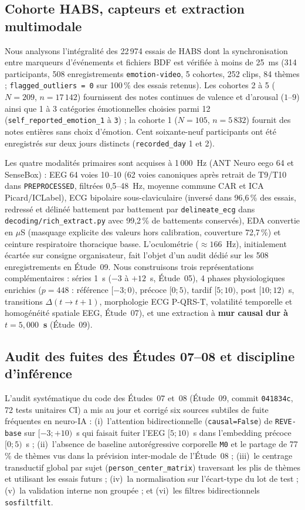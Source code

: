 \documentclass[10pt]{article}
\begin{document}
\subsection{Cohorte HABS, capteurs et extraction multimodale}

Nous analysons l'intégralité des 22\,974 essais de HABS dont la synchronisation entre marqueurs d'événements et fichiers BDF est vérifiée à moins de 25~ms (314 participants, 508 enregistrements \texttt{emotion-video}, 5 cohortes, 252 clips, 84 thèmes ; \texttt{flagged\_outliers = 0} sur 100\,\% des essais retenus). Les cohortes 2 à 5 ($N = 209$, $n = 17\,142$) fournissent des notes continues de valence et d'arousal ($1$--$9$) ainsi que 1 à 3 catégories émotionnelles choisies parmi 12 (\texttt{self\_reported\_emotion\_1} à \texttt{3}) ; la cohorte 1 ($N = 105$, $n = 5\,832$) fournit des notes entières sans choix d'émotion. Cent soixante-neuf participants ont été enregistrés sur deux jours distincts (\texttt{recorded\_day} 1 et 2).

Les quatre modalités primaires sont acquises à 1\,000~Hz (ANT Neuro eego 64 et SenseBox) : EEG 64 voies 10--10 (62 voies canoniques après retrait de T9/T10 dans \texttt{PREPROCESSED}, filtrées 0,5--48~Hz, moyenne commune CAR et ICA Picard/ICLabel), ECG bipolaire sous-claviculaire (inversé dans 96,6\,\% des essais, redressé et délinéé battement par battement par \texttt{delineate\_ecg} dans \texttt{decoding/\allowbreak rich\_extract.py} avec 99,2\,\% de battements conservés), EDA convertie en $\mu$S (masquage explicite des valeurs hors calibration, couverture 72,7\,\%) et ceinture respiratoire thoracique basse. L'oculométrie ($\approx 166$~Hz), initialement écartée sur consigne organisateur, fait l'objet d'un audit dédié sur les 508 enregistrements en Étude~09. Nous construisons trois représentations complémentaires : séries 1~s ($-3$ à $+12$~s, Étude~05), 4 phases physiologiques enrichies ($p = 448$ : référence $[-3 ; 0)$, précoce $[0 ; 5)$, tardif $[5 ; 10)$, post $[10 ; 12)$~s, transitions $\Delta(t\to t+1)$, morphologie ECG P-QRS-T, volatilité temporelle et homogénéité spatiale EEG, Étude~07), et une extraction à \textbf{mur causal dur à $t = 5{,}000$~s} (Étude~09).

\subsection{Audit des fuites des Études 07--08 et discipline d'inférence}

L'audit systématique du code des Études~07 et~08 (Étude~09, commit \texttt{041834c}, 72 tests unitaires CI) a mis au jour et corrigé six sources subtiles de fuite fréquentes en neuro-IA : (i)~l'attention bidirectionnelle (\texttt{causal=False}) de \texttt{REVE-base} sur $[-3 ; +10)$~s qui faisait fuiter l'EEG $[5 ; 10)$~s dans l'embedding précoce $[0 ; 5)$~s ; (ii)~l'absence de baseline autorégressive corporelle \texttt{M0} et le partage de 77\,\% de thèmes vus dans la prévision inter-modale de l'Étude~08 ; (iii)~le centrage transductif global par sujet (\texttt{person\_center\_matrix}) traversant les plis de thèmes et utilisant les essais futurs ; (iv)~la normalisation sur l'écart-type du lot de test ; (v)~la validation interne non groupée ; et (vi)~les filtres bidirectionnels \texttt{sosfiltfilt}.
\end{document}
